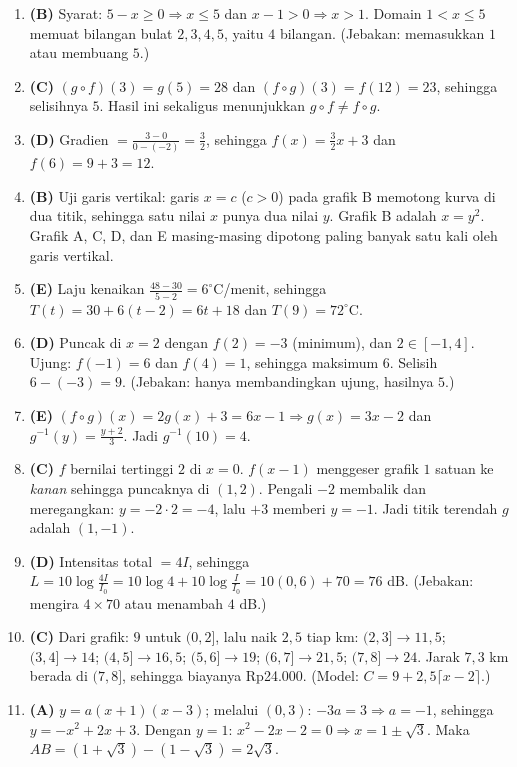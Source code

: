 \documentclass[a4paper,11pt]{article}
\begin{document}
\small\begin{enumerate}[leftmargin=2em,itemsep=2pt,topsep=2pt]
\item[\textbf{1.}] \textbf{(B)} Syarat: $5-x\ge0\Rightarrow x\le5$ dan $x-1>0\Rightarrow x>1$. Domain $1<x\le5$ memuat bilangan bulat $2,3,4,5$, yaitu $4$ bilangan. (Jebakan: memasukkan $1$ atau membuang $5$.)
\item[\textbf{2.}] \textbf{(C)} $(g\circ f)(3)=g(5)=28$ dan $(f\circ g)(3)=f(12)=23$, sehingga selisihnya $5$. Hasil ini sekaligus menunjukkan $g\circ f\neq f\circ g$.
\item[\textbf{3.}] \textbf{(D)} Gradien $=\frac{3-0}{0-(-2)}=\frac32$, sehingga $f(x)=\frac32x+3$ dan $f(6)=9+3=12$.
\item[\textbf{4.}] \textbf{(B)} Uji garis vertikal: garis $x=c$ ($c>0$) pada grafik B memotong kurva di dua titik, sehingga satu nilai $x$ punya dua nilai $y$. Grafik B adalah $x=y^2$. Grafik A, C, D, dan E masing-masing dipotong paling banyak satu kali oleh garis vertikal.
\item[\textbf{5.}] \textbf{(E)} Laju kenaikan $\frac{48-30}{5-2}=6^\circ$C/menit, sehingga $T(t)=30+6(t-2)=6t+18$ dan $T(9)=72^\circ$C.
\item[\textbf{6.}] \textbf{(D)} Puncak di $x=2$ dengan $f(2)=-3$ (minimum), dan $2\in[-1,4]$. Ujung: $f(-1)=6$ dan $f(4)=1$, sehingga maksimum $6$. Selisih $6-(-3)=9$. (Jebakan: hanya membandingkan ujung, hasilnya $5$.)
\item[\textbf{7.}] \textbf{(E)} $(f\circ g)(x)=2g(x)+3=6x-1\Rightarrow g(x)=3x-2$ dan $g^{-1}(y)=\frac{y+2}3$. Jadi $g^{-1}(10)=4$.
\item[\textbf{8.}] \textbf{(C)} $f$ bernilai tertinggi $2$ di $x=0$. $f(x-1)$ menggeser grafik $1$ satuan ke \emph{kanan} sehingga puncaknya di $(1,2)$. Pengali $-2$ membalik dan meregangkan: $y=-2\cdot2=-4$, lalu $+3$ memberi $y=-1$. Jadi titik terendah $g$ adalah $(1,-1)$.
\item[\textbf{9.}] \textbf{(D)} Intensitas total $=4I$, sehingga $L=10\log\frac{4I}{I_0}=10\log4+10\log\frac{I}{I_0}=10(0{,}6)+70=76$ dB. (Jebakan: mengira $4\times70$ atau menambah $4$ dB.)
\item[\textbf{10.}] \textbf{(C)} Dari grafik: $9$ untuk $(0,2]$, lalu naik $2{,}5$ tiap km: $(2,3]\to11{,}5$; $(3,4]\to14$; $(4,5]\to16{,}5$; $(5,6]\to19$; $(6,7]\to21{,}5$; $(7,8]\to24$. Jarak $7{,}3$ km berada di $(7,8]$, sehingga biayanya Rp24.000. (Model: $C=9+2{,}5\lceil x-2\rceil$.)
\item[\textbf{11.}] \textbf{(A)} $y=a(x+1)(x-3)$; melalui $(0,3)$: $-3a=3\Rightarrow a=-1$, sehingga $y=-x^2+2x+3$. Dengan $y=1$: $x^2-2x-2=0\Rightarrow x=1\pm\sqrt3$. Maka $AB=(1+\sqrt3)-(1-\sqrt3)=2\sqrt3$.

\end{enumerate}
\end{document}
